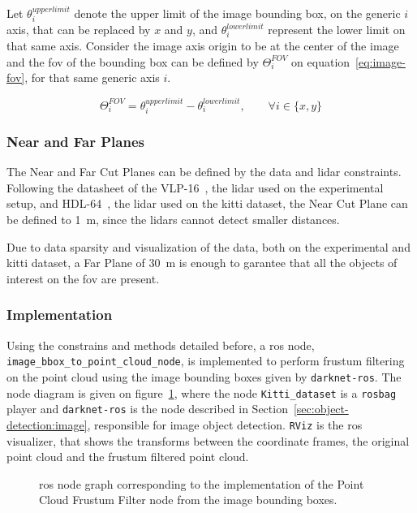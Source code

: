 Let $\theta^{upper limit}_i$ denote the upper limit of the image bounding box, on the generic $i$ axis, that can be replaced by $x$ and $y$, and $\theta^{lower limit}_i$ represent the lower limit on that same axis. Consider the image axis origin to be at the center of the image and the \ac{fov} of the bounding box can be defined by $\Theta^{FOV}_i$ on equation~\ref{eq:image-fov}, for that same generic axis $i$.


\begin{equation}
	\label{eq:image-fov}
	\Theta^{FOV}_i = \theta^{upper limit}_i - \theta^{lower limit}_i, \qquad \forall i \in \{x, y\}
\end{equation}

\subsubsection{Near and Far Planes}
The Near and Far Cut Planes can be defined by the data and \ac{lidar} constraints. Following the datasheet of the VLP-16~\cite{vlp16}, the \ac{lidar} used on the experimental setup, and HDL-64~\cite{VelodyneHDL64}, the \ac{lidar} used on the \ac{kitti} dataset, the Near Cut Plane can be defined to \SI{1}{\meter}, since the \acp{lidar} cannot detect smaller distances.

Due to data sparsity and visualization of the data, both on the experimental and  \ac{kitti} dataset, a Far Plane of \SI{30}{\meter} is enough to garantee that all the objects of interest on the \ac{fov} are present.

\subsubsection{Implementation}
Using the constrains and methods detailed before, a \ac{ros} node, \texttt{image\_bbox\_to\_point\_cloud\_node}, is implemented to perform frustum filtering on the point cloud using the image bounding boxes given by \texttt{darknet-ros}. The node diagram is given on figure~\ref{fig:ros-graph-frustum}, where the node \texttt{Kitti\_dataset} is a \texttt{rosbag} player and \texttt{darknet-ros} is the node described in Section~\ref{sec:object-detection:image}, responsible for image object detection. \texttt{RViz} is the \ac{ros} visualizer, that shows the transforms between the coordinate frames, the original point cloud and the frustum filtered point cloud.

\begin{figure}[H]
	\centering
	\def\svgwidth{\columnwidth}
	\graphicspath{{img/image-object-to-point-cloud/}}
	
	\caption{\ac{ros} node graph corresponding to the implementation of the Point Cloud Frustum Filter node from the image bounding boxes. }
	\label{fig:ros-graph-frustum}
\end{figure}

